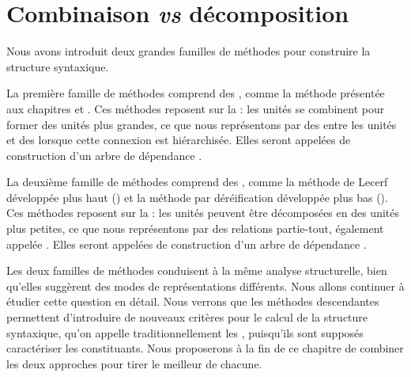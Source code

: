 \section{Combinaison \textit{vs} décomposition}\label{sec:3.4.8}

Nous avons introduit deux grandes familles de méthodes pour construire la structure syntaxique.

La première famille de méthodes comprend des , comme la méthode présentée aux chapitres  et . Ces méthodes reposent sur la  : les unités se combinent pour former des unités plus grandes, ce que nous représentons par des  entre les unités et des  lorsque cette connexion est hiérarchisée. Elles seront appelées  de construction d’un arbre de dépendance .

La deuxième famille de méthodes comprend des , com\-me la méthode de Lecerf développée plus haut () et la méthode par déréification développée plus bas (). Ces méthodes reposent sur la : les unités peuvent être décomposées en des unités plus petites, ce que nous représentons par des relations partie-tout, également appelée . Elles seront appelées  de construction d’un arbre de dépendance .

Les deux familles de méthodes conduisent à la même analyse structurelle, bien qu’elles suggèrent des modes de représentations différents. Nous allons continuer à étudier cette question en détail. Nous verrons que les méthodes descendantes permettent d’introduire de nouveaux critères pour le calcul de la structure syntaxique, qu’on appelle traditionnellement les , puisqu’ils sont supposés caractériser les constituants. Nous proposerons à la fin de ce chapitre de combiner les deux approches pour tirer le meilleur de chacune.

